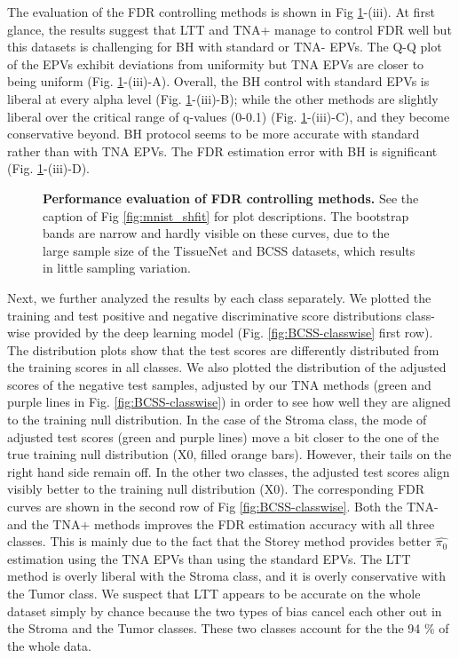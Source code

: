 \documentclass[10pt,letterpaper]{article}
\begin{document}
The evaluation of the FDR controlling methods is shown in Fig \ref{fig:ii}-(iii).
At first glance, the results suggest that LTT and TNA+ manage to control FDR well but this datasets is challenging for BH with standard or TNA- EPVs.
The Q-Q plot of the EPVs exhibit deviations from uniformity but TNA EPVs are closer to being uniform (Fig. \ref{fig:ii}-(iii)-A).
Overall, the BH control with standard EPVs is liberal at every alpha level (Fig. \ref{fig:ii}-(iii)-B); while the other methods are slightly liberal over the critical range of q-values (0-0.1) (Fig. \ref{fig:ii}-(iii)-C), and they become conservative beyond.
BH protocol seems to be more accurate with standard rather than with TNA EPVs.
The FDR estimation error with BH is significant (Fig. \ref{fig:ii}-(iii)-D). 

\begin{figure}
	\centering
	\caption{{\bf Performance evaluation of FDR controlling methods.}  See the caption of Fig \ref{fig:mnist_shfit} for plot descriptions. The bootstrap bands are narrow and hardly visible on these curves, due to the large sample size of the TissueNet and BCSS datasets, which results in little sampling variation.}
	\label{fig:ii}
\end{figure} 

Next, we further analyzed the results by each class separately.
We plotted the training and test positive and negative discriminative score distributions class-wise provided by the deep learning model (Fig. \ref{fig:BCSS-classwise} first row).
The distribution plots show that the test scores are differently distributed from the training scores in all classes.
We also plotted the distribution of the adjusted scores of the negative test samples, adjusted by our TNA methods (green and purple lines in Fig. \ref{fig:BCSS-classwise}) in order to see how well they are aligned to the training null distribution.
In the case of the Stroma class, the mode of adjusted test scores (green and purple lines) move a bit closer to the one of the true training null distribution (X0, filled orange bars).
However, their tails on the right hand side remain off.
In the other two classes, the adjusted test scores align visibly better to the training null distribution (X0).
The corresponding FDR curves are shown in the second row of Fig \ref{fig:BCSS-classwise}.
Both the TNA- and the TNA+ methods improves the FDR estimation accuracy with all three classes.
This is mainly due to the fact that the Storey method provides better $\hat{\pi_0}$ estimation using the TNA EPVs than using the standard EPVs.
The LTT method is overly liberal with the Stroma class, and it is overly conservative with the Tumor class.
We suspect that LTT appears to be accurate on the whole dataset simply by chance because the two types of bias cancel each other out in the Stroma and the Tumor classes.
These two classes account for the the 94 \% of the whole data.
\end{document}
